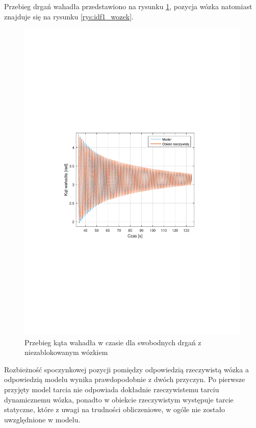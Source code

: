 \documentclass[12pt]{article}
\begin{document}
Przebieg drgań wahadła przedstawiono na rysunku \ref{rys:idf1_wahadlo},
pozycja wózka natomiast znajduje się na rysunku \ref{rys:idf1_wozek}.

\begin{figure}[!htb]
    \begin{center}
        \includegraphics[width=16cm,trim=3cm 9cm 3cm 9cm,clip]
        {../res/img/idf1_wahadlo.pdf}
    \end{center}
    \caption{Przebieg kąta wahadła w czasie dla swobodnych drgań z
    niezablokowanym wózkiem} 
    \label{rys:idf1_wahadlo}
\end{figure}

\newpage

Rozbieżność spoczynkowej pozycji pomiędzy odpowiedzią rzeczywistą wózka a
odpowiedzią modelu wynika prawdopodobnie z dwóch przyczyn. Po pierwsze przyjęty
model tarcia nie odpowiada dokładnie rzeczywistemu tarciu dynamicznemu wózka,
ponadto w obiekcie rzeczywistym występuje tarcie statyczne, które z uwagi na
trudności obliczeniowe, w ogóle nie zostało uwzględnione w modelu.
\end{document}
